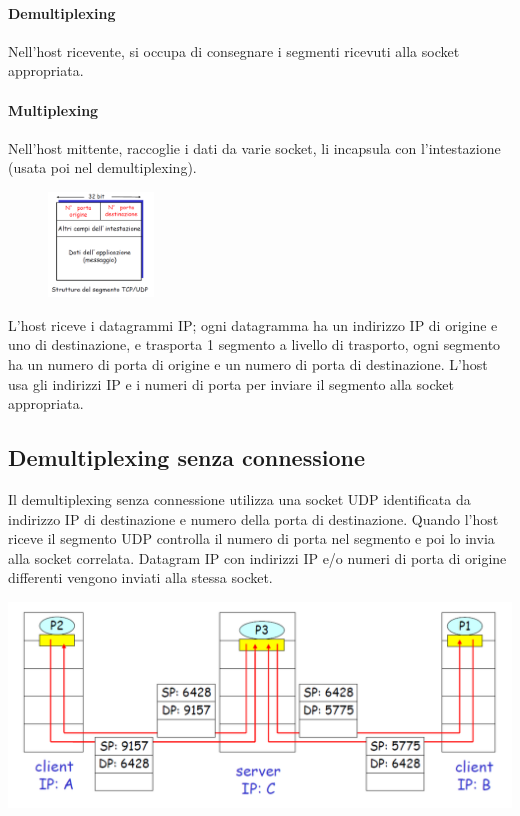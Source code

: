 \documentclass{report}
\begin{document}
	\paragraph{Demultiplexing} Nell'host ricevente, si occupa di consegnare i segmenti ricevuti alla socket appropriata.
	\paragraph{Multiplexing} Nell'host mittente, raccoglie i dati da varie socket, li incapsula con l'intestazione (usata poi nel demultiplexing).
	\newline
	\begin{figure}
		\centering
		\vspace{-20pt}
		\includegraphics[width=0.25\textwidth]{segmento-trasporto}
		\vspace{-30pt}
	\end{figure}
	L’host riceve i datagrammi IP; ogni datagramma ha un indirizzo IP di origine e uno di destinazione, e trasporta 1 segmento a livello di trasporto, ogni segmento ha un numero di porta di origine e un numero di porta di destinazione. L’host usa gli indirizzi IP e i numeri di porta per inviare il segmento alla socket appropriata.
	
	\subsection{Demultiplexing senza connessione}
	Il demultiplexing senza connessione utilizza una socket UDP identificata da indirizzo IP di destinazione e numero della porta di destinazione. Quando l'host riceve il segmento UDP controlla il numero di porta nel segmento e poi lo invia alla socket correlata. Datagram IP con indirizzi IP e/o numeri di porta di origine differenti vengono inviati alla stessa socket.
	\begin{center}
		\includegraphics[width=0.7\linewidth]{socket-udp}
	\end{center}
\end{document}
